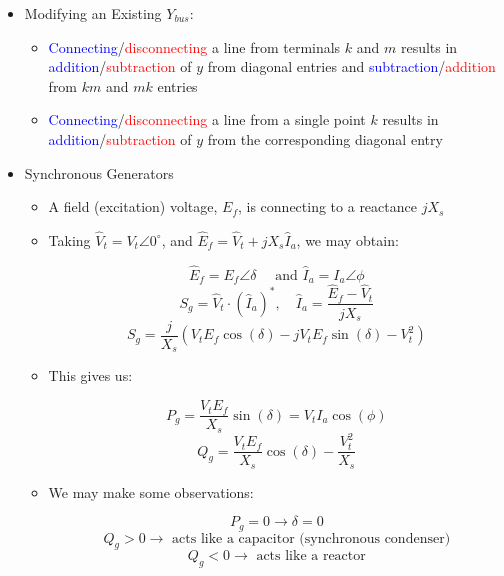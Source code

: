 \begin{itemize}

  \item Modifying an Existing $Y_{bus}$:

    \begin{itemize}

      \item \textcolor{blue}{Connecting}/\textcolor{red}{disconnecting} a line from terminals $k$ and $m$ results in \textcolor{blue}{addition}/\textcolor{red}{subtraction} of $y$ from diagonal entries and \textcolor{blue}{subtraction}/\textcolor{red}{addition} from $km$ and $mk$ entries

      \item \textcolor{blue}{Connecting}/\textcolor{red}{disconnecting} a line from a single point $k$ results in \textcolor{blue}{addition}/\textcolor{red}{subtraction} of $y$ from the corresponding diagonal entry

    \end{itemize}

  \item Synchronous Generators

    \begin{itemize}

      \item A field (excitation) voltage, $E_f$, is connecting to a reactance $jX_s$

      \item Taking $\hat{V}_t=V_t\angle 0^{\circ}$, and $\hat{E}_f=\hat{V}_t+jX_s\hat{I}_a$, we may obtain:

        $$\hat{E}_f=E_f\angle \delta\quad\text{ and }\hat{I}_a=I_a\angle\phi$$
        $$S_g=\hat{V}_t\cdot\left( \hat{I}_a \right)^*,\quad \hat{I}_a=\frac{\hat{E}_f-\hat{V}_t}{jX_s}$$
        $$S_g=\frac{j}{X_s}\left( V_tE_f\cos(\delta)- jV_tE_f\sin(\delta)-V_t^2 \right)$$

      \item This gives us:

        $$P_g=\frac{V_tE_f}{X_s}\sin(\delta)=V_tI_a\cos(\phi)$$
        $$Q_g=\frac{V_tE_f}{X_s}\cos(\delta)-\frac{V_t^2}{X_s}$$

      \item We may make some observations:

        $$P_g=0 \to \delta = 0$$
        $$Q_g>0\to\text{ acts like a capacitor (synchronous condenser)}$$
        $$Q_g<0\to\text{ acts like a reactor}$$

    \end{itemize}


\end{itemize}
